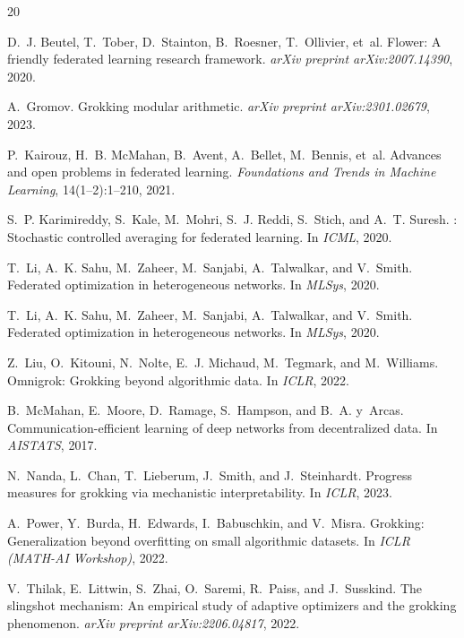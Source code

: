 \documentclass{article}
\begin{document}

\begin{thebibliography}{20}

D.~J. Beutel, T.~Tober, D.~Stainton, B.~Roesner, T.~Ollivier, et~al.
\newblock Flower: A friendly federated learning research framework.
\newblock \emph{arXiv preprint arXiv:2007.14390}, 2020.

A.~Gromov.
\newblock Grokking modular arithmetic.
\newblock \emph{arXiv preprint arXiv:2301.02679}, 2023.

P.~Kairouz, H.~B. McMahan, B.~Avent, A.~Bellet, M.~Bennis, et~al.
\newblock Advances and open problems in federated learning.
\newblock \emph{Foundations and Trends in Machine Learning}, 14(1--2):1--210, 2021.

S.~P. Karimireddy, S.~Kale, M.~Mohri, S.~J. Reddi, S.~Stich, and A.~T. Suresh.
: Stochastic controlled averaging for federated learning.
\newblock In \emph{ICML}, 2020.

T.~Li, A.~K. Sahu, M.~Zaheer, M.~Sanjabi, A.~Talwalkar, and V.~Smith.
\newblock Federated optimization in heterogeneous networks.
\newblock In \emph{MLSys}, 2020.

T.~Li, A.~K. Sahu, M.~Zaheer, M.~Sanjabi, A.~Talwalkar, and V.~Smith.
\newblock Federated optimization in heterogeneous networks.
\newblock In \emph{MLSys}, 2020.

Z.~Liu, O.~Kitouni, N.~Nolte, E.~J. Michaud, M.~Tegmark, and M.~Williams.
\newblock Omnigrok: Grokking beyond algorithmic data.
\newblock In \emph{ICLR}, 2022.

B.~McMahan, E.~Moore, D.~Ramage, S.~Hampson, and B.~A. y~Arcas.
\newblock Communication-efficient learning of deep networks from decentralized data.
\newblock In \emph{AISTATS}, 2017.

N.~Nanda, L.~Chan, T.~Lieberum, J.~Smith, and J.~Steinhardt.
\newblock Progress measures for grokking via mechanistic interpretability.
\newblock In \emph{ICLR}, 2023.

A.~Power, Y.~Burda, H.~Edwards, I.~Babuschkin, and V.~Misra.
\newblock Grokking: Generalization beyond overfitting on small algorithmic datasets.
\newblock In \emph{ICLR (MATH-AI Workshop)}, 2022.

V.~Thilak, E.~Littwin, S.~Zhai, O.~Saremi, R.~Paiss, and J.~Susskind.
\newblock The slingshot mechanism: An empirical study of adaptive optimizers and the grokking phenomenon.
\newblock \emph{arXiv preprint arXiv:2206.04817}, 2022.

\end{thebibliography}
\end{document}
